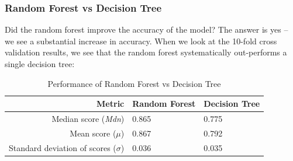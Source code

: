 \subsubsection{Random Forest vs Decision Tree}
Did the random forest improve the accuracy of the model? The answer is yes – we see a substantial increase in accuracy. When we look at the 10-fold cross validation results, we see that the random forest systematically out-performs a single decision tree:
\begin{table}[h]
	\centering
	\begin{adjustbox}{width=\linewidth}
	\begin{tabular}{rll}
		\textbf{Metric} & \textbf{Random Forest} & \textbf{Decision Tree}\\
		\hline
		Median score (\textit{\small{Mdn}}) & 0.865 & 0.775\\
		Mean score ($\mu$) & 0.867 & 0.792\\
		Standard deviation of scores ($\sigma$) & 0.036 & 0.035
	\end{tabular}
	\end{adjustbox}
	\caption{Performance of Random Forest vs Decision Tree}
\end{table}

